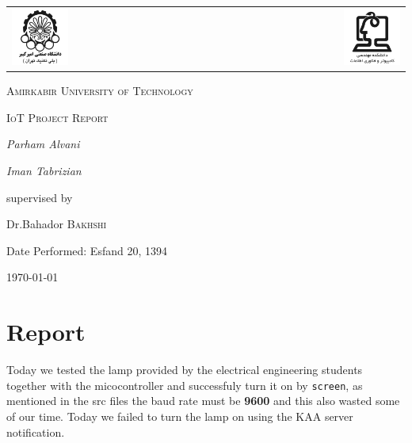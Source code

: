 \documentclass{article}
\begin{document}
\begin{titlepage}
	\centering
	\begin{tabular}{l r}
		\includegraphics[width=0.3\textwidth]{../AUT-CEIT-01.png}
		&
		\includegraphics[width=0.3\textwidth]{../AUT-CEIT-02.png}
	\end{tabular}
	\vspace{1cm}\par
	{\scshape\LARGE Amirkabir University of Technology \par}
	\vspace{1cm}
	{\scshape\Large IoT Project Report\par}
	\vspace{2cm}
	{\Large\itshape Parham Alvani\par}
	{\Large\itshape Iman Tabrizian\par}
	\vfill
	supervised by\par
	Dr.Bahador \textsc{Bakhshi}\par
    	Date Performed: Esfand 20, 1394
	\vfill
	{\large \today\par}
\end{titlepage}


\section*{Report}
Today we tested the lamp provided by the electrical engineering students together
with the micocontroller and successfuly turn it on by \texttt{screen}, as mentioned
in the src files the baud rate must be \textbf{9600} and this also wasted some
of our time. Today we failed to turn the lamp on using the KAA server notification.
\end{document}
